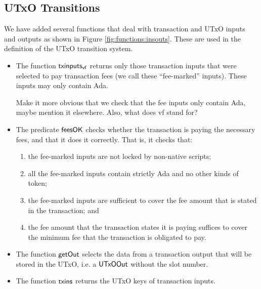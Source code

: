 \subsection{UTxO Transitions}
\label{sec:utxo-trans}

We have added several functions that deal with transaction and UTxO inputs and
outputs as shown in Figure \ref{fig:functions:insouts}. These are used in the definition of the UTxO transition system.

\begin{itemize}
  \item The function $\mathsf{txinputs_{vf}}$ returns only those transaction inputs
    that were selected to pay transaction fees (we call these ``fee-marked'' inputs).
    These inputs may only contain Ada.
    \begin{note}
      Make it more obvious that we check that the fee inputs only contain Ada, maybe mention it elsewhere. Also, what does vf stand for?
    \end{note}
  \item The predicate $\mathsf{feesOK}$ checks whether the transaction is
  paying the necessary fees, and that it does it correctly. That is, it checks that:
  \begin{enumerate}[label=({\roman*})]
    \item the fee-marked inputs are not locked by non-native scripts;
    \item all the fee-marked inputs contain strictly Ada and no other kinds of token;
    \item the fee-marked inputs are sufficient to cover the fee amount that is stated
    in the transaction; and
    \item the fee amount that the transaction states it is paying suffices to cover
    the minimum fee that the transaction is obligated to pay.
  \end{enumerate}
  \item The function $\mathsf{getOut}$ selects the data from a transaction output that
  will be stored in the UTxO, i.e. a $\mathsf{UTxOOut}$ without the slot number.
  \item The function $\mathsf{txins}$ returns the UTxO keys of transaction inputs.
\end{itemize}

